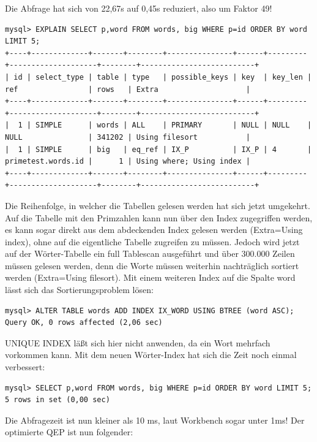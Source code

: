 Die Abfrage hat sich von 22,67s auf 0,45s reduziert, also um Faktor 49!
\begin{lstlisting}[basicstyle=\ttfamily\tiny, caption=Ausführungsplan nach 1. Optimierung]
mysql> EXPLAIN SELECT p,word FROM words, big WHERE p=id ORDER BY word LIMIT 5;
+----+-------------+-------+--------+---------------+------+---------+--------------------+--------+--------------------------+
| id | select_type | table | type   | possible_keys | key  | key_len | ref                | rows   | Extra                    |
+----+-------------+-------+--------+---------------+------+---------+--------------------+--------+--------------------------+
|  1 | SIMPLE      | words | ALL    | PRIMARY       | NULL | NULL    | NULL               | 341202 | Using filesort           |
|  1 | SIMPLE      | big   | eq_ref | IX_P          | IX_P | 4       | primetest.words.id |      1 | Using where; Using index |
+----+-------------+-------+--------+---------------+------+---------+--------------------+--------+--------------------------+
\end{lstlisting}
Die Reihenfolge, in welcher die Tabellen gelesen werden hat sich jetzt umgekehrt.
Auf die Tabelle mit den Primzahlen kann nun über den Index zugegriffen werden, es kann sogar direkt aus dem abdeckenden Index gelesen werden (Extra=Using index), ohne auf die eigentliche Tabelle zugreifen zu müssen. Jedoch wird jetzt auf der Wörter-Tabelle ein full Tablescan ausgeführt und über 300.000 Zeilen müssen gelesen werden, denn die Worte müssen weiterhin nachträglich sortiert werden (Extra=Using filesort).
Mit einem weiteren Index auf die Spalte word lässt sich das Sortierungsproblem lösen:
\begin{lstlisting}[caption=2. Optimierung: Anlegen eines Index für die Wörter]
mysql> ALTER TABLE words ADD INDEX IX_WORD USING BTREE (word ASC);
Query OK, 0 rows affected (2,06 sec)
\end{lstlisting}
UNIQUE INDEX läßt sich hier nicht anwenden, da ein Wort mehrfach vorkommen kann.
Mit dem neuen Wörter-Index hat sich die Zeit noch einmal verbessert:
\begin{lstlisting}[caption=Abfrage nach 2. Optimierung]
mysql> SELECT p,word FROM words, big WHERE p=id ORDER BY word LIMIT 5;
5 rows in set (0,00 sec)
\end{lstlisting}
Die Abfragezeit ist nun kleiner als 10 ms, laut Workbench sogar unter 1ms! Der optimierte QEP ist nun folgender:
